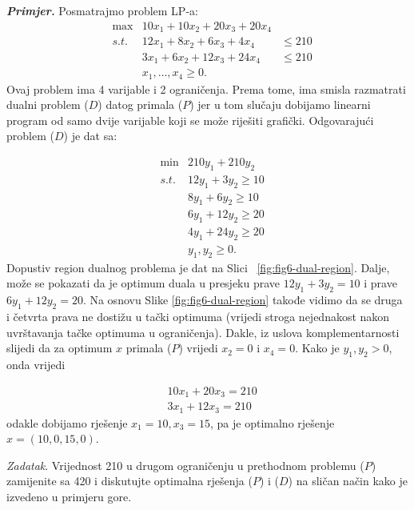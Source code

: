 \documentclass[a4paper, utf8, 11pt, colorlinks]{book}
\begin{document}
\emph{\textbf{Primjer.}} Posmatrajmo problem LP-a:
$$\begin{array}{llll}
   &\max                     &10 x_1 + 10 x_2 + 20 x_3 + 20 x_4  & \\
   &{s.t. }      &12 x_1 + 8 x_2  + 6 x_3  + 4 x_4   & \leq 210 \\
    &                        &3 x_1 + 6 x_2   + 12 x_3 + 24 x_4 & \leq 210 \\
     &                       & x_1,\ldots, x_4 \geq 0.                                 &
\end{array}
$$
Ovaj problem ima 4 varijable i 2 ograničenja. Prema tome, ima smisla razmatrati dualni problem  ($D$)  datog primala  ($P$)  jer u tom slučaju dobijamo linearni program od samo dvije varijable koji se može riješiti grafički.  Odgovarajući problem ($D$) je dat sa:

$$\begin{array}{lll}
    &\min                    &  210 y_1 + 210 y_2      \\
    &{s.t. }     &  12 y_1  + 3   y_2 \geq 10 \\
    &                        &  8  y_1 + 6    y_2 \geq 10 \\
    &                        &  6 y_1 + 12 y_2  \geq 20 \\
    &                        &  4 y_1 + 24 y_2  \geq 20 \\
    &                        &  y_1, y_2 \geq 0.
\end{array}$$
Dopustiv region dualnog problema je dat na Slici~ \ref{fig:fig6-dual-region}. %
Dalje, može se pokazati da je optimum duala u presjeku prave $12 y_1 + 3 y_2 = 10$ i prave $6y_1 + 12 y_2 = 20$. Na osnovu Slike \ref{fig:fig6-dual-region} takođe vidimo da se druga i četvrta prava ne dostižu u tački optimuma (vrijedi stroga nejednakost nakon uvrštavanja tačke optimuma u ograničenja). Dakle, iz uslova komplementarnosti slijedi da za optimum $x$ primala  ($P$)  vrijedi $x_2 = 0$ i $x_4 = 0$.  Kako je $y_1, y_2 > 0$, onda vrijedi 

\begin{align}
    &10 x_1 + 20 x_3 = 210 \nonumber \\
    & 3x_1 + 12 x_3  = 210 \nonumber
\end{align}
odakle dobijamo rješenje $x_1 = 10, x_3 = 15$, pa je optimalno rješenje $x = (10, 0, 15, 0)$.

\emph{Zadatak}. Vrijednost 210 u drugom ograničenju u prethodnom problemu  ($P$)  zamijenite sa 420 i diskutujte optimalna rješenja  ($P$)  i  ($D$)  na sličan način kako je izvedeno  u primjeru gore.
\end{document}
